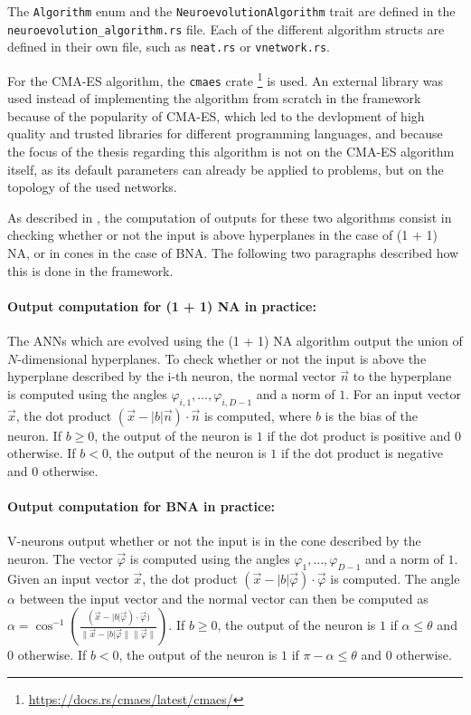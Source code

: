 The \texttt{Algorithm} enum and the \texttt{NeuroevolutionAlgorithm} trait are defined in the \\ \texttt{neuroevolution\_algorithm.rs} file.
Each of the different algorithm structs are defined in their own file, such as \texttt{neat.rs} or \texttt{vnetwork.rs}.

For the CMA-ES algorithm, the \texttt{cmaes} crate \footnote{\url{https://docs.rs/cmaes/latest/cmaes/}}  is used. An external library was used instead of implementing
the algorithm from scratch in the framework because of the popularity of CMA-ES, which led to the devlopment of high quality and trusted libraries for different programming
languages, and because the focus of the thesis regarding this algorithm is not on the CMA-ES algorithm itself, as its default parameters can already be applied to problems, but
on the topology of the used networks.

As described in , the computation of outputs for these two algorithms consist in checking whether or
not the input is above hyperplanes in the case of (1 + 1) NA, or in cones in the case of BNA. The following two paragraphs described how this is done in the framework.

\paragraph{Output computation for (1 + 1) NA in practice: }
The ANNs which are evolved using the (1 + 1) NA algorithm output the union of $N$-dimensional hyperplanes. To check whether or not the input is above the
hyperplane described by the i-th neuron, the normal vector $\overrightarrow{n}$ to the hyperplane is computed using the angles $\varphi_{i,1}, \dots, \varphi_{i,D-1}$
and a norm of $1$. For an input vector $\overrightarrow{x}$, the dot product $(\overrightarrow{x} - \lvert b \rvert \overrightarrow{n}) \cdot \overrightarrow{n}$ is
computed, where $b$ is the bias of the neuron. If $b \geq 0$, the output of the neuron is $1$ if the dot product is positive and $0$ otherwise. If $b < 0$,
the output of the neuron is $1$ if the dot product is negative and $0$ otherwise.

\paragraph{Output computation for BNA in practice: }
V-neurons output whether or not the input is in the cone described by the neuron. The vector $\overrightarrow{\varphi}$ is computed using the angles $\varphi_1, \ldots, \varphi_{D-1}$
and a norm of $1$. Given an input vector $\overrightarrow{x}$, the dot product $(\overrightarrow{x} - \lvert b \rvert \overrightarrow{\varphi}) \cdot \overrightarrow{\varphi}$ is computed.
The angle $\alpha$ between the input vector and the normal vector can then be computed as
$\alpha = \cos^{-1}(\frac{(\overrightarrow{x} - \lvert b \rvert \overrightarrow{\varphi}) \cdot \overrightarrow{\varphi})}{\lVert \overrightarrow{x} - \lvert b \rvert \overrightarrow{\varphi} \rVert
\lVert \overrightarrow{\varphi} \rVert})$. If $b \geq 0$, the output of the neuron is $1$ if $\alpha \leq \theta$ and $0$ otherwise. If $b < 0$, the output of the neuron is
$1$ if $\pi - \alpha \leq \theta$ and $0$ otherwise.

